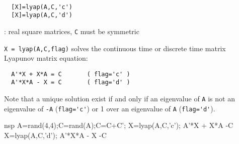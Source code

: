 \begin{mandesc}
   \\ %
\end{mandesc}
\begin{calling_sequence}
\begin{verbatim}
  [X]=lyap(A,C,'c')  
  [X]=lyap(A,C,'d')  
\end{verbatim}
\end{calling_sequence}
\begin{parameters}
  \begin{varlist}
    : real square matrices, \verb!C! must be symmetric
  \end{varlist}
\end{parameters}
\begin{mandescription}
  \verb!X = lyap(A,C,flag)! solves the continuous time or
  discrete time matrix Lyapunov matrix equation:
\begin{verbatim}
  A'*X + X*A = C       ( flag='c' )
  A'*X*A - X = C       ( flag='d' )
\end{verbatim}
Note that a unique solution exist if and only if an eigenvalue of \verb!A! is
not an eigenvalue of \verb!-A! (\verb!flag='c'!)  or 1 over an eigenvalue of \verb!A! 
(\verb!flag='d'!).
\end{mandescription}
\begin{examples}
  \begin{mintednsp}{nsp}
    A=rand(4,4);C=rand(A);C=C+C';
    X=lyap(A,C,'c');
    A'*X + X*A -C
    X=lyap(A,C,'d');
    A'*X*A - X -C
  \end{mintednsp}
\end{examples}
\begin{manseealso}
      
\end{manseealso}
